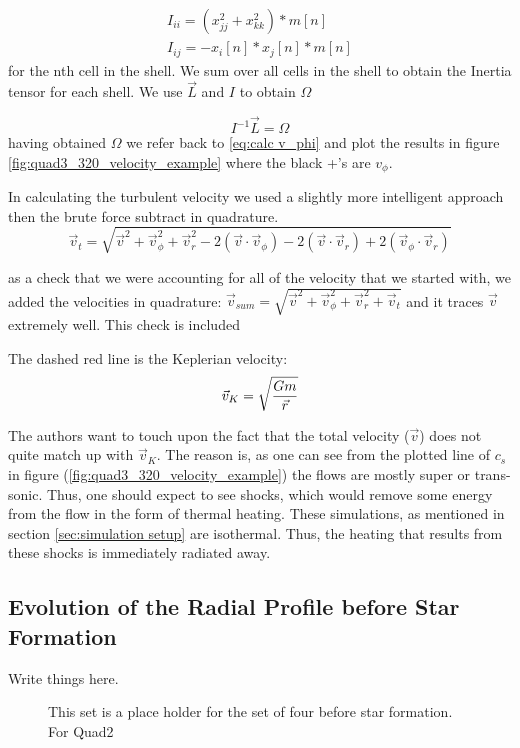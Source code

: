 \documentclass{emulateapj}
\newcommand{\be}{\begin{equation}}
\newcommand{\ee}{\end{equation}}
\begin{document}
\begin{gather*}
I_{ii} = (x_{jj}^2 + x_{kk}^2) * m[n]\\
I_{ij} = -x_{i}[n]*x_{j}[n] * m[n]
\label{eq:moment of inertia}
\end{gather*}
for the nth cell in the shell. We sum over all cells in the shell to obtain the Inertia tensor for each shell.
We use $\vec{L}$ and $I$ to obtain $\Omega$

\be
I^{-1}\vec{L} = \Omega
\label{eq:Obtain Omega}
\ee
having obtained $\Omega$ we refer back to \ref{eq:calc v_phi} and plot the results in figure \ref{fig:quad3_320_velocity_example} where the black +'s are $v_{\phi}$.

In calculating the turbulent velocity we used a slightly more intelligent approach then the brute force subtract in quadrature.
\be
\vec{v}_{t} = \sqrt{\vec{v}^2 + \vec{v}_{\phi}^2 + \vec{v}_{r}^2 - 2(\vec{v} \cdot \vec{v}_{\phi}) - 2(\vec{v} \cdot \vec{v}_{r}) + 2(\vec{v}_{\phi} \cdot \vec{v}_{r})}
\label{eq:Vrms subtraction}
\ee

as a check that we were accounting for all of the velocity that we started with, we added the velocities in quadrature: $\vec{v}_{sum} = \sqrt{\vec{v}^2 + \vec{v}_{\phi}^2 + \vec{v}_{r}^2 + \vec{v}_{t}}$ and it traces $\vec{v}$ extremely well. This check is included

The dashed red line is the Keplerian velocity:
\be
\vec{v}_{K} = \sqrt{G m \over \vec{r}}
\label{eq:Kepler velocity}
\ee

The authors want to touch upon the fact that the total velocity ($\vec{v}$) does not quite match up with $\vec{v}_{K}$. The reason is, as one can see from the plotted line of $c_s$ in figure (\ref{fig:quad3_320_velocity_example}) the flows are mostly super or trans-sonic. Thus, one should expect to see shocks, which would remove some energy from the flow in the form of thermal heating. These simulations, as mentioned in section \ref{sec:simulation setup} are isothermal. Thus, the heating that results from these shocks is immediately radiated away.
\subsection{Evolution of the Radial Profile before Star Formation}

Write things here.

\begin{figure}
\caption{This set is a place holder for the set of four before star formation. For Quad2
\label{fig:quad3_000_four}}
\end{figure}
\end{document}
